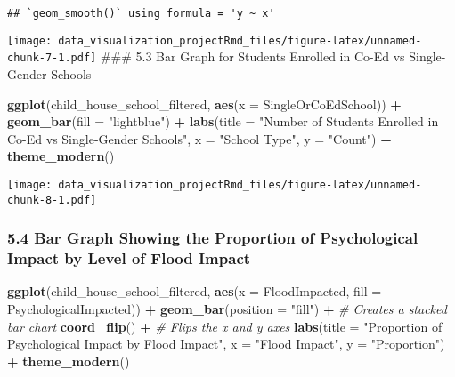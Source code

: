 \documentclass[
]{article}
\newenvironment{Shaded}{\begin{snugshade}}{\end{snugshade}}
\newcommand{\AttributeTok}[1]{\textcolor[rgb]{0.13,0.29,0.53}{#1}}
\newcommand{\CommentTok}[1]{\textcolor[rgb]{0.56,0.35,0.01}{\textit{#1}}}
\newcommand{\FunctionTok}[1]{\textcolor[rgb]{0.13,0.29,0.53}{\textbf{#1}}}
\newcommand{\NormalTok}[1]{#1}
\newcommand{\SpecialCharTok}[1]{\textcolor[rgb]{0.81,0.36,0.00}{\textbf{#1}}}
\newcommand{\StringTok}[1]{\textcolor[rgb]{0.31,0.60,0.02}{#1}}
\begin{document}
\begin{verbatim}
## `geom_smooth()` using formula = 'y ~ x'
\end{verbatim}

\texttt{[image: data\_visualization\_projectRmd\_files/figure-latex/unnamed-chunk-7-1.pdf]}
\#\#\# 5.3 Bar Graph for Students Enrolled in Co-Ed vs Single-Gender
Schools

\begin{Shaded}
\begin{Highlighting}[]
\FunctionTok{ggplot}\NormalTok{(child\_house\_school\_filtered, }\FunctionTok{aes}\NormalTok{(}\AttributeTok{x =}\NormalTok{ SingleOrCoEdSchool)) }\SpecialCharTok{+}
  \FunctionTok{geom\_bar}\NormalTok{(}\AttributeTok{fill =} \StringTok{"lightblue"}\NormalTok{) }\SpecialCharTok{+}
  \FunctionTok{labs}\NormalTok{(}\AttributeTok{title =} \StringTok{"Number of Students Enrolled in Co{-}Ed vs Single{-}Gender Schools"}\NormalTok{, }\AttributeTok{x =} \StringTok{"School Type"}\NormalTok{, }\AttributeTok{y =} \StringTok{"Count"}\NormalTok{) }\SpecialCharTok{+}
  \FunctionTok{theme\_modern}\NormalTok{()}
\end{Highlighting}
\end{Shaded}

\texttt{[image: data\_visualization\_projectRmd\_files/figure-latex/unnamed-chunk-8-1.pdf]}

\subsubsection{5.4 Bar Graph Showing the Proportion of Psychological
Impact by Level of Flood
Impact}\label{bar-graph-showing-the-proportion-of-psychological-impact-by-level-of-flood-impact}

\begin{Shaded}
\begin{Highlighting}[]
\FunctionTok{ggplot}\NormalTok{(child\_house\_school\_filtered, }\FunctionTok{aes}\NormalTok{(}\AttributeTok{x =}\NormalTok{ FloodImpacted, }\AttributeTok{fill =}\NormalTok{ PsychologicalImpacted)) }\SpecialCharTok{+}
  \FunctionTok{geom\_bar}\NormalTok{(}\AttributeTok{position =} \StringTok{"fill"}\NormalTok{) }\SpecialCharTok{+}  \CommentTok{\# Creates a stacked bar chart}
  \FunctionTok{coord\_flip}\NormalTok{() }\SpecialCharTok{+}  \CommentTok{\# Flips the x and y axes}
  \FunctionTok{labs}\NormalTok{(}\AttributeTok{title =} \StringTok{"Proportion of Psychological Impact by Flood Impact"}\NormalTok{, }\AttributeTok{x =} \StringTok{"Flood Impact"}\NormalTok{, }\AttributeTok{y =} \StringTok{"Proportion"}\NormalTok{) }\SpecialCharTok{+}
  \FunctionTok{theme\_modern}\NormalTok{()}
\end{Highlighting}
\end{Shaded}
\end{document}
